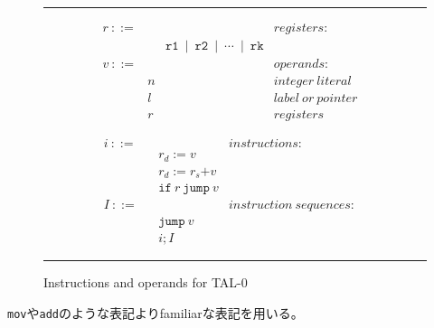 \documentclass[a4paper,oneside]{ltjsarticle}
\begin{document}
\newpage
\begin{figure}[ht]
	\noindent\hrule{}

	\begin{minipage}[t]{.5\textwidth}
		\begin{flushleft}
			\begin{align*}
				&r\ \mathtt{::=}&&&registers:&\\
			 &&&\mathtt{r1\ \mid\ r2\ \mid\ \cdots\ \mid\ rk}&&&\\
			 &v\ \mathtt{::=}&&&operands:&\\
			 &&n&&integer\ literal&\\
			 &&l &&label\ or\ pointer&\\
			 &&r&&registers&
			\end{align*}
		\end{flushleft}
	\end{minipage}%
	\vrule{}
	\begin{minipage}[t]{.5\textwidth}
		\begin{flushright}
			\begin{align*}
				&i\ \mathtt{::=}&&&instructions:&\\
			 &&&r_d\mathtt{:=}v&&&\\
			 &&&r_d\mathtt{:=}r_s\mathtt{+}v&&&\\
			 &&&\mathtt{if}\ r\ \mathtt{jump}\ v&&&\\
			 &I\ \mathtt{::=}&&&instruction\ sequences:&\\
			 &&&\mathtt{jump}\ v&&&\\
			 &&&i;I&&&
			\end{align*}
		\end{flushright}
	\end{minipage}

	\noindent\hrule{}
	\caption{Instructions and operands for TAL-0}
\end{figure}

\texttt{mov}や\texttt{add}のような表記よりfamiliarな表記を用いる。
\end{document}
